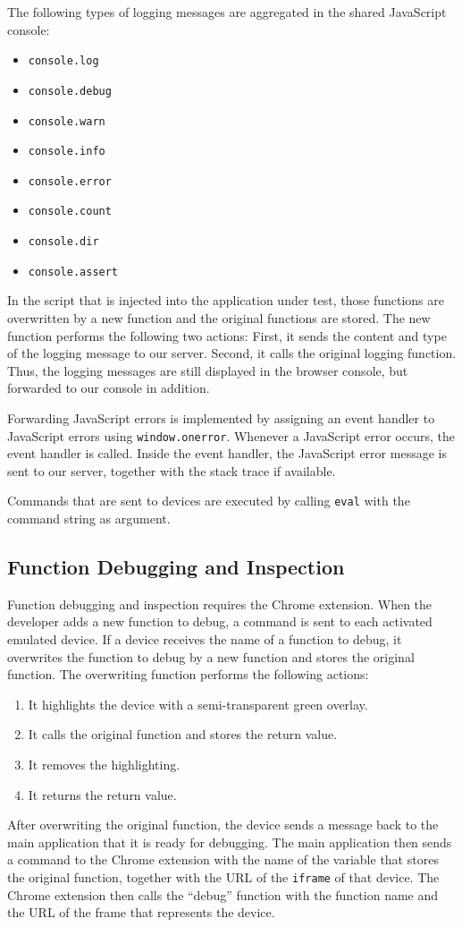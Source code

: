 The following types of logging messages are aggregated in the shared JavaScript console:
\begin{itemize}
	\item \lstinline|console.log|
	\item \lstinline|console.debug|
	\item \lstinline|console.warn|
	\item \lstinline|console.info|
	\item \lstinline|console.error|
	\item \lstinline|console.count|
	\item \lstinline|console.dir|
	\item \lstinline|console.assert|
\end{itemize}
In the script that is injected into the application under test, those functions are overwritten by a new function and the original functions are stored. The new function performs the following two actions: First, it sends the content and type of the logging message to our server. Second, it calls the original logging function. Thus, the logging messages are still displayed in the browser console, but forwarded to our console in addition.

Forwarding JavaScript errors is implemented by assigning an event handler to JavaScript errors using \lstinline|window.onerror|. Whenever a JavaScript error occurs, the event handler is called. Inside the event handler, the JavaScript error message is sent to our server, together with the stack trace if available. 

Commands that are sent to devices are executed by calling \lstinline|eval| with the command string as argument.

\subsection{Function Debugging and Inspection}

Function debugging and inspection requires the Chrome extension. When the developer adds a new function to debug, a command is sent to each activated emulated device. If a device receives the name of a function to debug, it overwrites the function to debug by a new function and stores the original function. The overwriting function performs the following actions:
\begin{enumerate}
	\item It highlights the device with a semi-transparent green overlay.
	\item It calls the original function and stores the return value.
	\item It removes the highlighting.
	\item It returns the return value.
\end{enumerate}
After overwriting the original function, the device sends a message back to the main application that it is ready for debugging. The main application then sends a command to the Chrome extension with the name of the variable that stores the original function, together with the URL of the \lstinline|iframe| of that device. The Chrome extension then calls the ``debug'' function with the function name and the URL of the frame that represents the device.

